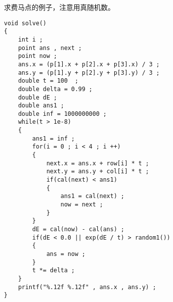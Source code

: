 \documentclass[E:/GsjzTle/main/main.tex]{subfiles}
\begin{document}
求费马点的例子，注意用真随机数。

\begin{lstlisting}
void solve()
{
	int i ;
	point ans , next ;
	point now ;
	ans.x = (p[1].x + p[2].x + p[3].x) / 3 ;
	ans.y = (p[1].y + p[2].y + p[3].y) / 3 ;
	double t = 100  ;
	double delta = 0.99 ;
	double dE ;
	double ans1 ;
	double inf = 1000000000 ;
	while(t > 1e-8)
	{
		ans1 = inf ;
		for(i = 0 ; i < 4 ; i ++)
		{
			next.x = ans.x + row[i] * t ;
			next.y = ans.y + col[i] * t ;
			if(cal(next) < ans1)
			{
				ans1 = cal(next) ;
				now = next ;
			}		   	 
		}
		dE = cal(now) - cal(ans) ;
		if(dE < 0.0 || exp(dE / t) > random1())
		{
			ans = now ;
		}
		t *= delta ;
	}
	printf("%.12f %.12f" , ans.x , ans.y) ;
}


\end{lstlisting}
\end{document}
